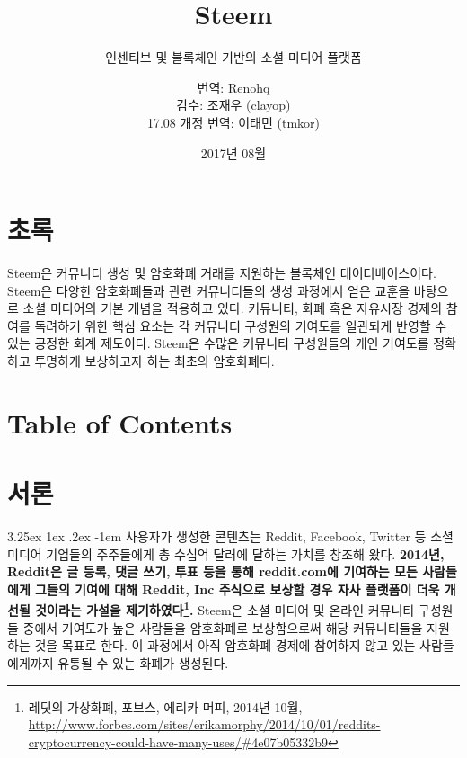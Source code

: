 \documentclass{article}
\title{Steem}
\subtitle{인센티브 및 블록체인 기반의 소셜 미디어 플랫폼}
\date{2017년 08월}
\author{번역: Renohq \\ 감수: 조재우 (clayop) \\ 17.08 개정 번역: 이태민 (tmkor)}
\makeatletter
\renewcommand\paragraph{\@startsection{paragraph}{5}{\z@}%
  {3.25ex \@plus1ex \@minus.2ex}%
  {-1em}%
  {\normalfont\normalsize\bfseries}}
\makeatother
\begin{document}
    \renewcommand \thesection{\roman{section}}

    \maketitle

    \newpage

    \section{초록}

Steem은 커뮤니티 생성 및 암호화폐 거래를 지원하는 블록체인 데이터베이스이다. Steem은 다양한 암호화폐들과 관련 커뮤니티들의 생성 과정에서 얻은 교훈을 바탕으로 소셜 미디어의 기본 개념을 적용하고 있다. 커뮤니티, 화폐 혹은 자유시장 경제의 참여를 독려하기 위한 핵심 요소는 각 커뮤니티 구성원의 기여도를 일관되게 반영할 수 있는 공정한 회계 제도이다. Steem은 수많은 커뮤니티 구성원들의 개인 기여도를 정확하고 투명하게 보상하고자 하는 최초의 암호화폐다.
    \newpage

    \section{Table of Contents}

    \tableofcontents

    \newpage

    \setcounter{section}{0}

    \renewcommand \thesection{\arabic{section}}

    \section{서론}

        \paragraph{}
            사용자가 생성한 콘텐츠는 Reddit, Facebook, Twitter 등 소셜 미디어 기업들의 주주들에게 총 수십억 달러에 달하는 가치를 창조해 왔다. \textbf{2014년, Reddit은 글 등록, 댓글 쓰기, 투표 등을 통해 reddit.com에 기여하는 모든 사람들에게 그들의 기여에 대해 Reddit, Inc 주식으로 보상할 경우 자사 플랫폼이 더욱 개선될 것이라는 가설을 제기하였다\footnote{레딧의 가상화폐, 포브스, 에리카 머피, 2014년 10월, 
\newline\url{http://www.forbes.com/sites/erikamorphy/2014/10/01/reddits-cryptocurrency-could-have-many-uses/\#4e07b05332b9}}.} Steem은 소셜 미디어 및 온라인 커뮤니티 구성원들 중에서 기여도가 높은 사람들을 암호화폐로 보상함으로써 해당 커뮤니티들을 지원하는 것을 목표로 한다. 이 과정에서 아직 암호화폐 경제에 참여하지 않고 있는 사람들에게까지 유통될 수 있는 화폐가 생성된다.
            
\end{document}
